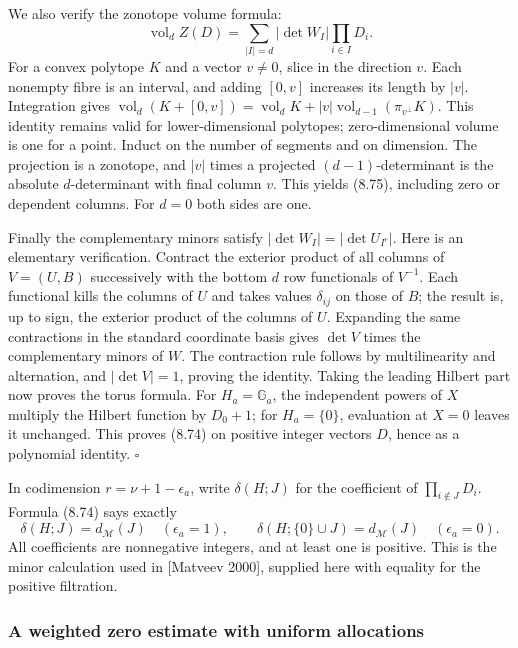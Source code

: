 \documentclass[
  11pt,
  a4paper,
]{article}
\begin{document}
We also verify the zonotope volume formula: \[
\operatorname{vol}_d Z(D)=
\sum_{|I|=d}|\det W_I|\prod_{i\in I}D_i.
\tag{8.75}
\] For a convex polytope \(K\) and a vector \(v\ne0\), slice in the
direction \(v\). Each nonempty fibre is an interval, and adding
\([0,v]\) increases its length by \(|v|\). Integration gives
\(\operatorname{vol}_d(K+[0,v])
=\operatorname{vol}_dK+
|v|\operatorname{vol}_{d-1}(\pi_{v^\perp}K)\). This identity remains
valid for lower-dimensional polytopes; zero-dimensional volume is one
for a point. Induct on the number of segments and on dimension. The
projection is a zonotope, and \(|v|\) times a projected
\((d-1)\)-determinant is the absolute \(d\)-determinant with final
column \(v\). This yields (8.75), including zero or dependent columns.
For \(d=0\) both sides are one.

Finally the complementary minors satisfy \(|\det W_I|=|\det U_{I^c}|\).
Here is an elementary verification. Contract the exterior product of all
columns of \(V=(U,B)\) successively with the bottom \(d\) row
functionals of \(V^{-1}\). Each functional kills the columns of \(U\)
and takes values \(\delta_{ij}\) on those of \(B\); the result is, up to
sign, the exterior product of the columns of \(U\). Expanding the same
contractions in the standard coordinate basis gives \(\det V\) times the
complementary minors of \(W\). The contraction rule follows by
multilinearity and alternation, and \(|\det V|=1\), proving the
identity. Taking the leading Hilbert part now proves the torus formula.
For \(H_a=\mathbb G_a\), the independent powers of \(X\) multiply the
Hilbert function by \(D_0+1\); for \(H_a=\{0\}\), evaluation at \(X=0\)
leaves it unchanged. This proves (8.74) on positive integer vectors
\(D\), hence as a polynomial identity. \(\square\)

In codimension \(r=\nu+1-\epsilon_a\), write \(\delta(H;J)\) for the
coefficient of \(\prod_{i\notin J}D_i\). Formula (8.74) says exactly \[
\delta(H;J)=d_{\mathcal M}(J)\quad(\epsilon_a=1),\qquad
\delta(H;\{0\}\cup J)=d_{\mathcal M}(J)\quad(\epsilon_a=0).
\tag{8.76}
\] All coefficients are nonnegative integers, and at least one is
positive. This is the minor calculation used in {[}Matveev 2000{]},
supplied here with equality for the positive filtration.

\subsubsection{A weighted zero estimate with uniform
allocations}\label{a-weighted-zero-estimate-with-uniform-allocations}
\end{document}
